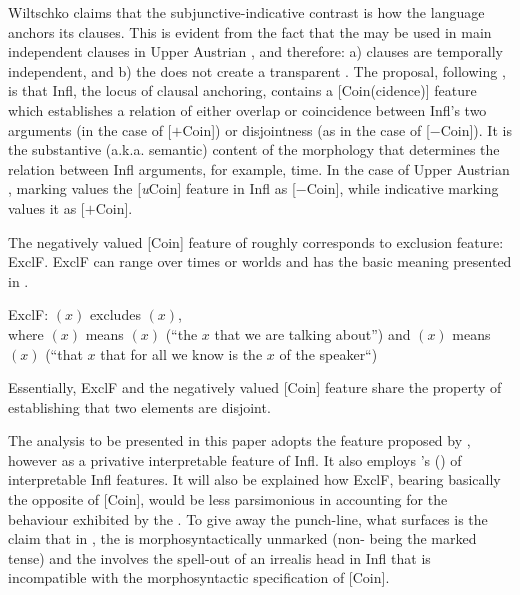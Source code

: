 \documentclass[output=paper,modfonts,newtxmath,hidelinks,]{langscibook}
\begin{document}
\noindent Wiltschko claims that the subjunctive-indicative contrast is how the language anchors its clauses. This is evident from the fact that the  may be used in main independent clauses in Upper Austrian , and therefore: a)  clauses are temporally independent, and b) the  does not create a transparent . The proposal, following \citet{RitterWiltschko2005,RitterWiltschko2009}, is that Infl, the locus of clausal anchoring, contains a [Coin(cidence)] feature which establishes a relation of either overlap or coincidence between Infl’s two arguments (in the case of [$+$Coin]) or disjointness (as in the case of [$-$Coin]). It is the substantive (a.k.a. semantic) content of the morphology that determines the relation between Infl arguments, for example, time. In the case of Upper Austrian ,  marking values the [\textit{u}Coin] feature in Infl as [$-$Coin], while indicative marking values it as [$+$Coin].\largerpage

The negatively valued [Coin] feature of \citet{RitterWiltschko2005,RitterWiltschko2014} roughly corresponds to   exclusion feature: ExclF. ExclF can range over times or worlds and has the basic meaning presented in .

\newpage 
\ea \label{10:ex21}
ExclF: $(x)$ excludes $(x)$,\\where {}$(x)$ means $(x)$ (“the $x$ that we are talking about”) and $(x)$ means $(x)$ (“that $x$ that for all we know is the $x$ of the speaker“)
    \hfill \citep[246]{Iatridou2000}
	\z
\z

\noindent Essentially, ExclF and the negatively valued [Coin] feature share the property of establishing that two elements are disjoint.

The analysis to be presented in this paper adopts the feature proposed by \citet{RitterWiltschko2005,RitterWiltschko2009}, however as a privative interpretable feature of Infl. It also employs \citeauthor{Cowper2002}'s (\citeyear{Cowper2002,Cowper2005})  of interpretable Infl features. It will also be explained how ExclF, bearing basically the opposite  of [Coin], would be less parsimonious in accounting for the behaviour exhibited by the  . To give away the punch-line, what surfaces is the claim that in , the  is morphosyntactically unmarked (non- being the marked tense) and the   involves the spell-out of an irrealis head in Infl that is incompatible with the morphosyntactic specification of [Coin]. 
\end{document}

